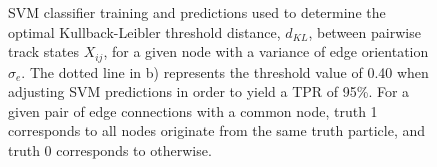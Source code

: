 \begin{figure}[htbp!] 
    \centering
    \hfill%
    \caption{SVM classifier training and predictions used to determine the optimal Kullback-Leibler threshold distance, $d_{KL}$, between pairwise track states $X_{ij}$, for a given node with a variance of edge orientation $\sigma_e$. The dotted line in b) represents the threshold value of 0.40 when adjusting SVM predictions in order to yield a TPR of 95\%. For a given pair of edge connections with a common node, truth 1 corresponds to all nodes originate from the same truth particle, and truth 0 corresponds to otherwise.}
    \label{fig:KL-distance}
\end{figure}













